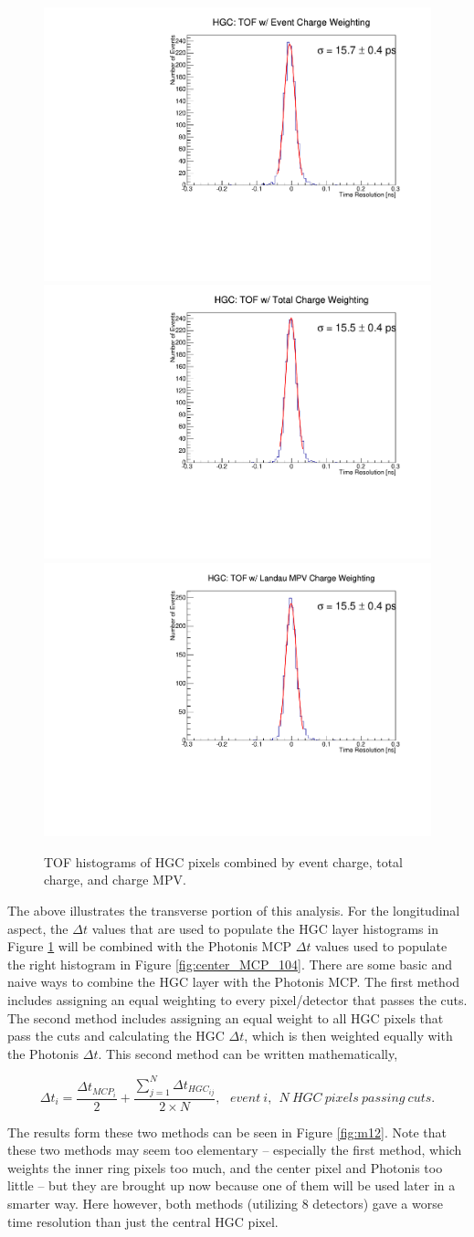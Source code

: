 \documentclass[12pt]{article}
\begin{document}
\begin{figure}[h]
\centering
	\includegraphics[width=.32\textwidth]{deltaTPicoSilEventCharge104.pdf}
	\includegraphics[width=.32\textwidth]{deltaTPicoSilTotalCharge104.pdf}
	\includegraphics[width=.32\textwidth]{deltaTPicoSilLandauCharge104.pdf}
	\caption{TOF histograms of HGC pixels combined by event charge, total charge, and charge MPV.}
	\label{fig:HGC_event_total_MPV_104}
\end{figure}

The above illustrates the transverse portion of this analysis. 
For the longitudinal aspect, the $\Delta t$ values that are used to populate the HGC layer histograms in Figure \ref{fig:HGC_event_total_MPV_104} will be combined with the Photonis MCP $\Delta t$ values used to populate the right histogram in Figure \ref{fig:center_MCP_104}.
There are some basic and naive ways to combine the HGC layer with the Photonis MCP.
The first method includes assigning an equal weighting to every pixel/detector that passes the cuts.
The second method includes assigning an equal weight to all HGC pixels that pass the cuts and calculating the HGC $\Delta t$, which is then weighted equally with the Photonis $\Delta t$.
This second method can be written mathematically,

\[
\Delta t_i = \dfrac{ \Delta t_{MCP_i} }{2} + \dfrac{\sum\limits_{j=1}^N \Delta t_{HGC_{ij}} }{2\times N},\ \ \ event\ i,\ \ N\ HGC\ pixels\ passing\ cuts.
\]

The results form these two methods can be seen in Figure \ref{fig:m12}. 
Note that these two methods may seem too elementary -- especially the first method, which weights the inner ring pixels too much, and the center pixel and Photonis too little -- but they are brought up now because one of them will be used later in a smarter way. 
Here however, both methods (utilizing 8 detectors) gave a worse time resolution than just the central HGC pixel.	
\end{document}
